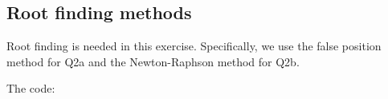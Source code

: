 \subsection{Root finding methods}

Root finding is needed in this exercise. Specifically, we use the false position method for Q2a and the Newton-Raphson method for Q2b.

\noindent The code:
